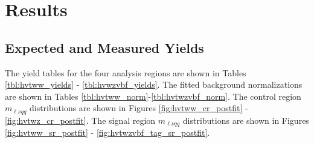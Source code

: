 \chapter{Results}
\section{Expected and Measured Yields}
The yield tables for the four analysis regions are shown in Tables \ref{tbl:hvtww_yields} - \ref{tbl:hvwzvbf_yields}. The fitted background normalizations are shown in Tables \ref{tbl:hvtww_norm}-\ref{tbl:hvtwzvbf_norm}. The control region $m_{\ell\nu qq}$ distributions are shown in Figures \ref{fig:hvtww_cr_postfit} - \ref{fig:hvtwz_cr_postfit}. The signal region $m_{\ell\nu qq}$ distributions are shown in Figures \ref{fig:hvtww_sr_postfit} - \ref{fig:hvtwzvbf_tag_sr_postfit}.
